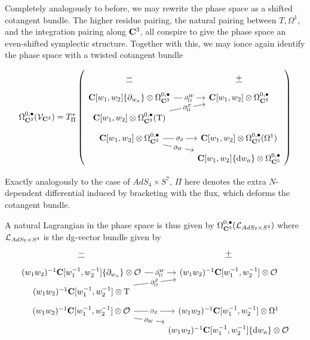 \documentclass[../main.tex]{subfiles}
\begin{document}
Completely analogously to before, we may rewrite the phase space as a shifted cotangent bundle. The higher residue pairing, the natural pairing between $T, \Omega^1$, and the integration pairing along $\mathbf{C}^3$, all conspire to give the phase space an even-shifted symplectic structure. Together with this, we may ionce again identify the phase space with a twisted cotangent bundle 

\[
\Omega^{0,\bullet}_{\C^3} (\mc V_{\C^3}) = T^* _{\Pi} \left (\begin{tikzcd}[row sep = 1 ex] 
\ul{-} & \ul{+} \\
\C[w_1,w_2] \{\partial_{w_a}\} \otimes \Omega^{0,\bullet}_{\C^3} \ar[r, "\del^W_\Omega" description] & \C[w_1,w_2] \otimes \Omega^{0,\bullet}_{\C^3}  \\
\C[w_1,w_2] \otimes \Omega^{0,\bullet}_{\C^3} (\T)\ar[ur, "\del^Z_\Omega" description] \\
\C[w_1,w_2] \otimes \Omega^{0,\bullet}_{\C^3} \ar[r, "\del_Z" description]\ar[dr, "\del_W" description] & \C[w_1,w_2]\otimes \Omega^{0,\bullet}_{\C^3} (\Omega^1) \\ &  \C[w_1,w_2] \{\d w_a\} \otimes \Omega^{0,\bullet}_{\C^3} 
\end{tikzcd} \right) 
\]

Exactly analogously to the case of $AdS_4\times S^7$, $\Pi$ here denotes the extra $N$-dependent differential induced by bracketing with the flux, which deforms the cotangent bundle. 

A natural Lagrangian in the phase space is thus given by $\Omega^{0,\bullet}_{\mathbf{C}^3} (\mathcal{L}_{AdS_7\times S^4})$ where $\mathcal{L}_{AdS_7\times S^4}$ is the dg-vector bundle given by  
\begin{equation}
\begin{tikzcd}[row sep = 1 ex]
    \ul{-} & \ul{+} \\
(w_1w_2)^{-1} \C[w_1^{-1}, w_2^{-1}] \{\partial_{w_a}\} \otimes \mc{O}\ar[r, "\del^W_\Omega" description] & (w_1w_2)^{-1} \C[w_1^{-1}, w_2^{-1}] \otimes \mc O \\
(w_1w_2)^{-1} \C[w_1^{-1}, w_2^{-1}] \otimes \T\ar[ur, "\del^Z_\Omega" description] \\
(w_1w_2)^{-1} \C[w_1^{-1}, w_2^{-1}] \otimes \mc{O}\ar[r, "\del_Z" description]\ar[dr, "\del_W" description] & (w_1w_2)^{-1} \C[w_1^{-1}, w_2^{-1}]  \otimes \Omega^1 \\ & (w_1w_2)^{-1} \C[w_1^{-1}, w_2^{-1}] \{\d w_a\} \otimes \mc O
\end{tikzcd}
\end{equation}
\end{document}
